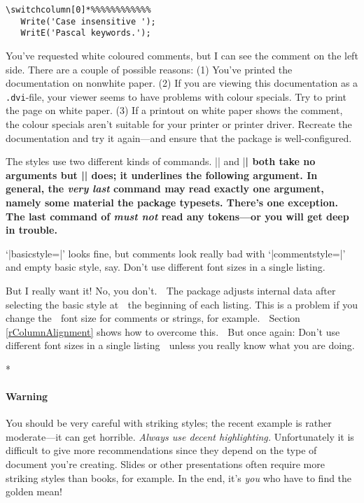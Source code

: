 \begin{paracol}{2}
\begin{paracol}{2}
{\begin{lstsample}{}{}
\begin{lstlisting}
\switchcolumn[0]*%%%%%%%%%%%%
   Write('Case insensitive ');
   WritE('Pascal keywords.');
   \end{lstlisting}
\end{lstsample}
\ifcolor
\begin{advise}
\item You've requested white coloured comments, but I can see the comment
      on the left side.
      \advisespace
      There are a couple of possible reasons:
      (1) You've printed the documentation on nonwhite paper.
      (2) If you are viewing this documentation as a \texttt{.dvi}-file, your
          viewer seems to have problems with colour specials. Try to print
          the page on white paper.
      (3) If a printout on white paper shows the comment, the colour
          specials aren't suitable for your printer or printer driver.
          Recreate the documentation and try it again---and ensure that
          the  package is well-configured.
\end{advise}
\fi
The styles use two different kinds of commands. |\ttfamily| and |\bfseries|
both take no arguments but |\underbar| does; it underlines the following
argument. In general, the \emph{very last} command may read exactly one
argument, namely some material the package typesets. There's one exception.
The last command of  \emph{must not} read any
tokens---or you will get deep in trouble.
\begin{advise}
\item `|basicstyle=\small|' looks fine, but comments look really bad with
      `|commentstyle=\tiny|' and empty basic style, say.
      \advisespace
      Don't use different font sizes in a single listing.
\item But I really want it!
      \advisespace
      No, you don't.
^^A       The package adjusts internal data after selecting the basic style at
^^A       the beginning of each listing. This is a problem if you change the
^^A       font size for comments or strings, for example.
^^A       Section \ref{rColumnAlignment} shows how to overcome this.
^^A       But once again: Don't use different font sizes in a single listing
^^A       unless you really know what you are doing.
\end{advise}
\switchcolumn

\switchcolumn[0]*%
\paragraph{Warning}\label{wStrikingStyles}
You should be very careful with striking styles; the recent example is rather
moderate---it can get horrible. \emph{Always use decent highlighting.}
Unfortunately it is difficult to give more recommendations since they depend
on the type of document you're creating. Slides or other presentations often
require more striking styles than books, for example.
In the end, it's \emph{you} who have to find the golden mean!
\switchcolumn

}
\end{paracol}
\end{paracol}
